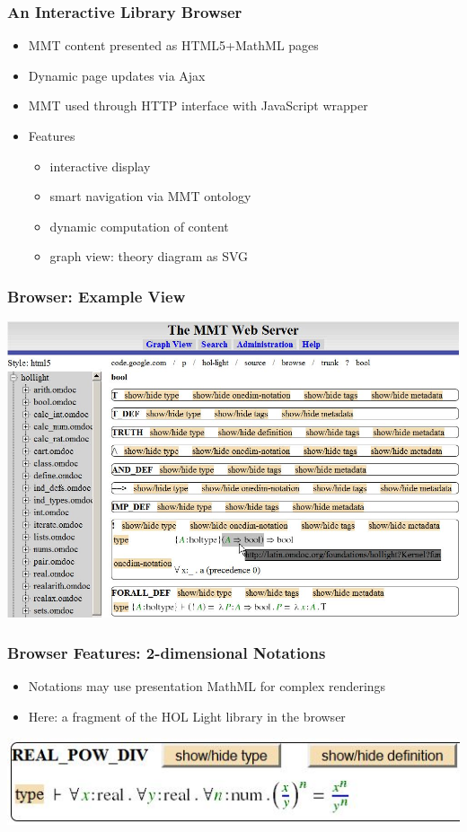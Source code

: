 \documentclass{beamer}
\begin{document}
\begin{frame}\frametitle{An Interactive Library Browser}
\begin{itemize}
\item MMT content presented as HTML5+MathML pages
\item Dynamic page updates via Ajax
\item MMT used through HTTP interface with JavaScript wrapper
\item Features
  \begin{itemize}
    \item interactive display
    \item smart navigation via MMT ontology
    \item dynamic computation of content
    \item graph view: theory diagram as SVG
  \end{itemize}
\end{itemize}
\end{frame}


\begin{frame}\frametitle{Browser: Example View}
\includegraphics[width=\textwidth]{img/browse.jpg}
\end{frame}

\begin{frame}\frametitle{Browser Features: 2-dimensional Notations}
\begin{itemize}
\item Notations may use presentation MathML for complex renderings
\item Here: a fragment of the HOL Light library in the browser
\end{itemize}

\includegraphics[width=\textwidth]{img/2dnot.jpg}
\end{frame}
\end{document}
